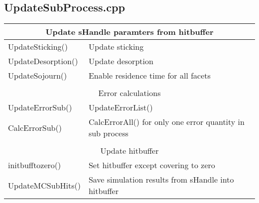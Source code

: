 \subsection{UpdateSubProcess.cpp}

\begin{center}
\begin{tabular}{|l|l|}
\hline
\multicolumn{2}{|c|}{\rule{0pt}{3ex}Update sHandle paramters from hitbuffer}\\
\hline
\rule{0pt}{3ex} UpdateSticking()& Update sticking\\
\rule{0pt}{3ex} UpdateDesorption()& Update desorption \\
\rule{0pt}{3ex} UpdateSojourn()& Enable residence time for all facets\\%
\hline
\multicolumn{2}{l}{}\\
\hline
\multicolumn{2}{|c|}{\rule{0pt}{3ex}Error calculations}\\
\hline
\rule{0pt}{3ex} UpdateErrorSub()& UpdateErrorList()\\
\rule{0pt}{3ex} CalcErrorSub()&  CalcErrorAll() for only one error quantity in sub process\\
\hline
\multicolumn{2}{l}{}\\
\hline
\multicolumn{2}{|c|}{\rule{0pt}{3ex}Update hitbuffer}\\
\hline
\rule{0pt}{3ex} initbufftozero()& Set hitbuffer except covering to zero\\
\rule{0pt}{3ex} UpdateMCSubHits()& Save simulation results from sHandle into hitbuffer\\
\hline
\end{tabular}
\end{center}

